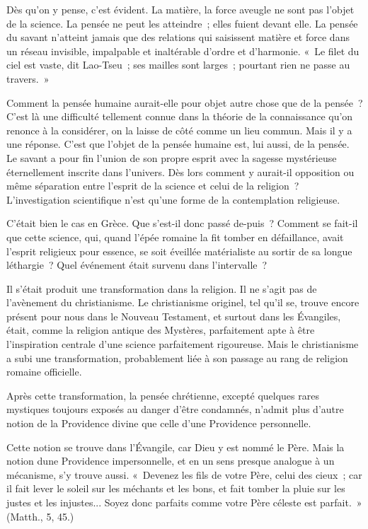 \documentclass[french,twoside]{book} %
\begin{document}
Dès qu'on y pense, c'est évident. La matière, la force aveugle ne sont pas l'objet de la science. La pensée ne peut les atteindre ; elles fuient devant elle. La pensée du savant n'atteint jamais que des relations qui saisissent matière et force dans un réseau invisible, impalpable et inaltérable d'ordre et d'harmonie. « Le filet du ciel est vaste, dit Lao-Tseu ; ses mailles sont larges ; pourtant rien ne passe au travers. »\par
\par
Comment la pensée humaine aurait-elle pour objet autre chose que de la pensée ? C'est là une difficulté tellement connue dans la théorie de la connaissance qu'on renonce à la considérer, on la laisse de côté comme un lieu commun. Mais il y a une réponse. C'est que l'objet de la pensée humaine est, lui aussi, de la pensée. Le savant a pour fin l'union de son propre esprit avec la sagesse mystérieuse éternellement inscrite dans l'univers. Dès lors comment y aurait-il opposition ou même séparation entre l'esprit de la science et celui de la religion ? L'investigation scientifique n'est qu'une forme de la contemplation religieuse.\par
C'était bien le cas en Grèce. Que s'est-il donc passé de-puis ? Comment se fait-il que cette science, qui, quand l'épée romaine la fit tomber en défaillance, avait l'esprit religieux pour essence, se soit éveillée matérialiste au sortir de sa longue léthargie ? Quel événement était survenu dans l'intervalle ?\par
Il s'était produit une transformation dans la religion. Il ne s'agit pas de l'avènement du christianisme. Le christianisme originel, tel qu'il se, trouve encore présent pour nous dans le Nouveau Testament, et surtout dans les Évangiles, était, comme la religion antique des Mystères, parfaitement apte à être l'inspiration centrale d'une science parfaitement rigoureuse. Mais le christianisme a subi une transformation, probablement liée à son passage au rang de religion romaine officielle.\par
Après cette transformation, la pensée chrétienne, excepté quelques rares mystiques toujours exposés au danger d'être condamnés, n'admit plus d'autre notion de la Providence divine que celle d'une Providence personnelle.\par
Cette notion se trouve dans l'Évangile, car Dieu y est nommé le Père. Mais la notion dune Providence impersonnelle, et en un sens presque analogue à un mécanisme, s'y trouve aussi. « Devenez les fils de votre Père, celui des cieux ; car il fait lever le soleil sur les méchants et les bons, et fait tomber la pluie sur les justes et les injustes... Soyez donc parfaits comme votre Père céleste est parfait. » (Matth., 5, 45.)\par
\end{document}
